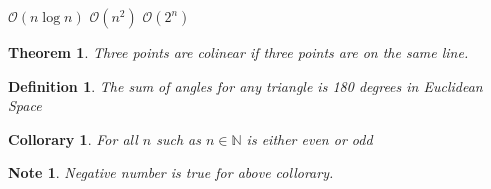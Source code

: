 \documentclass{article}
\newtheorem{theorem}{Theorem}
\newtheorem{defintion}{Definition}
\newtheorem{collorary}{Collorary}
\newtheorem{note}{Note}
\begin{document}
$\mathcal{O}(n\log{}n)$
$\mathcal{O}(n^2)$
$\mathcal{O}(2^n)$ 

\begin{theorem}
Three points are colinear if three points are on the same line.
\end{theorem}

\begin{defintion}
The sum of angles for any triangle is 180 degrees in Euclidean Space
\end{defintion}

\begin{collorary}
For all $n$ such as $n \in \mathbb{N}$ is either even or odd
\end{collorary}



\begin{note}
Negative number is true for above collorary.
\end{note}
\end{document}
